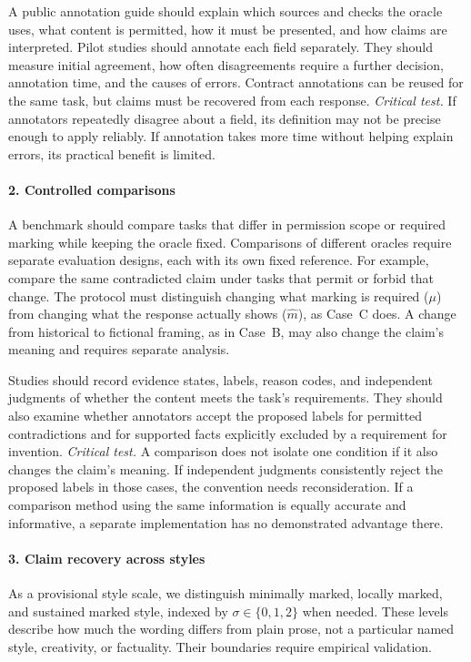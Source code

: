 \documentclass{clv2025}
\begin{document}
A public annotation guide should explain which sources and checks the oracle
uses, what content is permitted, how it must be presented, and how claims are
interpreted. Pilot studies should annotate each field separately. They should
measure initial agreement, how often disagreements require a further decision,
annotation time, and the causes of errors. Contract annotations can be reused
for the same task, but claims must be recovered from each response.
\emph{Critical test.} If annotators repeatedly disagree about a field, its
definition may not be precise enough to apply reliably. If annotation takes
more time without helping explain errors, its practical benefit is limited.

\paragraph{2. Controlled comparisons}
A benchmark should compare tasks that differ in permission scope or required
marking while keeping the oracle fixed. Comparisons of different oracles
require separate evaluation designs, each with its own fixed reference.
For example, compare the same contradicted claim under tasks that permit
or forbid that change. The protocol must distinguish changing what marking
is required ($\mu$) from changing what the response actually shows
($\widehat{m}$), as Case~C does. A change from historical to fictional framing,
as in Case~B, may also change the claim's meaning and requires separate analysis.

Studies should record evidence states, labels, reason codes, and independent
judgments of whether the content meets the task's requirements. They should
also examine whether annotators accept the proposed labels for permitted
contradictions and for supported facts explicitly excluded by a requirement
for invention.
\emph{Critical test.} A comparison does not isolate one condition if it also
changes the claim's meaning. If independent judgments consistently reject
the proposed labels in those cases, the convention needs reconsideration.
If a comparison method using the same information is equally accurate and
informative, a separate implementation has no demonstrated advantage there.

\paragraph{3. Claim recovery across styles}\label{par:style-scale}
As a provisional style scale, we distinguish minimally marked, locally
marked, and sustained marked style, indexed by $\sigma\in\{0,1,2\}$ when
needed. These levels describe how much the wording differs from plain prose,
not a particular named style, creativity, or factuality. Their boundaries
require empirical validation.
\end{document}
